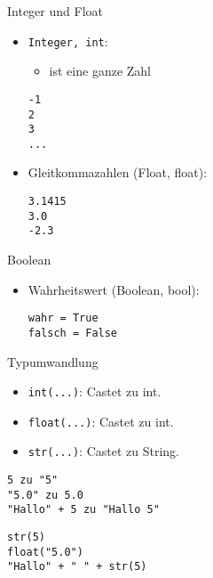 \begin{frame}[fragile]{Integer und Float}
\begin{itemize}
	\item \texttt{Integer, int}: 
	\begin{itemize}
		\item ist eine ganze Zahl
	\end{itemize}
	\begin{lstlisting}
-1
2
3
...
	\end{lstlisting}
    \item Gleitkommazahlen (Float, float):
    \begin{lstlisting}
3.1415
3.0
-2.3
    \end{lstlisting}
\end{itemize}
\end{frame}


\begin{frame}[fragile]{Boolean}
\begin{itemize}    
	\item Wahrheitswert (Boolean, bool): 
\begin{lstlisting}
wahr = True
falsch = False
\end{lstlisting}
\end{itemize}
\end{frame}

\begin{frame}[fragile]{Typumwandlung}
\begin{itemize}
	\item \lstinline{int(...)}: Castet zu int.
	\item \lstinline{float(...)}: Castet zu int.
	\item \lstinline{str(...)}: Castet zu String.
	
\end{itemize}	
\begin{lstlisting}
5 zu "5"
"5.0" zu 5.0
"Hallo" + 5 zu "Hallo 5"
\end{lstlisting}
\pause{}
\begin{lstlisting}
str(5)
float("5.0")
"Hallo" + " " + str(5)
\end{lstlisting}
\end{frame}






